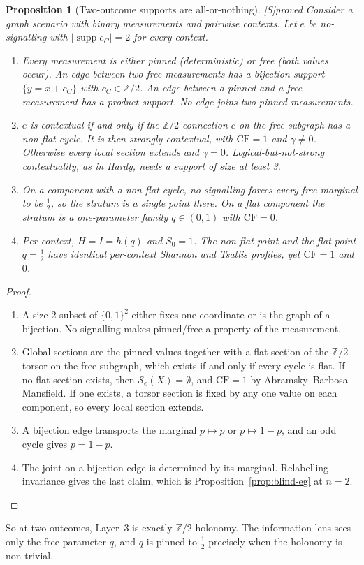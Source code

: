 \documentclass[11pt]{article}
\newtheorem{proposition}[theorem]{Proposition}
\theoremstyle{definition}
\theoremstyle{remark}
\newcommand{\Z}{\mathbb{Z}}
\newcommand{\CF}{\mathrm{CF}}
\newcommand{\src}[1]{\textsf{\small[#1]}}
\newcommand{\st}[1]{\textsf{\small\color{gray}#1}}
\begin{document}
\begin{proposition}[Two-outcome supports are all-or-nothing]\label{prop:two}\src{S}\st{proved}
Consider a graph scenario with binary measurements and pairwise contexts. Let $e$ be no-signalling with $|\operatorname{supp}e_C|=2$ for every context.
\begin{enumerate}
  \item Every measurement is either \emph{pinned} (deterministic) or \emph{free} (both values occur). An edge between two free measurements has a bijection support $\{y=x+c_C\}$ with $c_C\in\Z/2$. An edge between a pinned and a free measurement has a product support. No edge joins two pinned measurements.
  \item $e$ is contextual if and only if the $\Z/2$ connection $c$ on the free subgraph has a non-flat cycle. It is then \emph{strongly} contextual, with $\CF=1$ and $\gamma\neq0$. Otherwise every local section extends and $\gamma=0$. Logical-but-not-strong contextuality, as in Hardy, needs a support of size at least 3.
  \item On a component with a non-flat cycle, no-signalling forces every free marginal to be $\tfrac12$, so the stratum is a single point there. On a flat component the stratum is a one-parameter family $q\in(0,1)$ with $\CF=0$.
  \item Per context, $H=I=h(q)$ and $S_0=1$. The non-flat point and the flat point $q=\tfrac12$ have identical per-context Shannon and Tsallis profiles, yet $\CF=1$ and $0$.
\end{enumerate}
\end{proposition}
\begin{proof}
\begin{enumerate}
  \item A size-2 subset of $\{0,1\}^2$ either fixes one coordinate or is the graph of a bijection. No-signalling makes pinned/free a property of the measurement.
  \item Global sections are the pinned values together with a flat section of the $\Z/2$ torsor on the free subgraph, which exists if and only if every cycle is flat. If no flat section exists, then $\mathcal S_e(X)=\emptyset$, and $\CF=1$ by Abramsky--Barbosa--Mansfield. If one exists, a torsor section is fixed by any one value on each component, so every local section extends.
  \item A bijection edge transports the marginal $p\mapsto p$ or $p\mapsto1-p$, and an odd cycle gives $p=1-p$.
  \item The joint on a bijection edge is determined by its marginal. Relabelling invariance gives the last claim, which is Proposition~\ref{prop:blind-eg} at $n=2$.
\end{enumerate}
\end{proof}
\noindent So at two outcomes, Layer~3 is exactly $\Z/2$ holonomy. The information lens sees only the free parameter $q$, and $q$ is pinned to $\tfrac12$ precisely when the holonomy is non-trivial.
\end{document}
